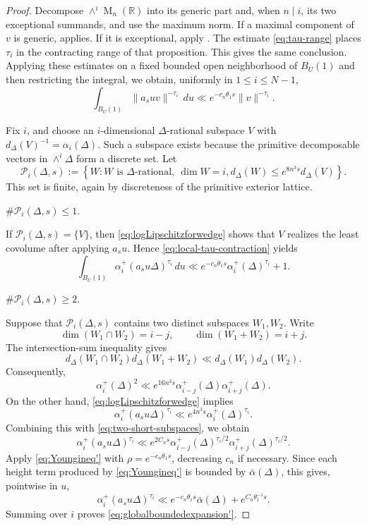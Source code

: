 \documentclass[reqno,11pt]{amsart}
\numberwithin{equation}{section}
\theoremstyle{definition}
\theoremstyle{remark}
\newcommand{\op}{\operatorname}
\newcommand{\M}{\op{M}}
\begin{document}
\begin{proof}
 Decompose
$\wedge^i\M_n(\mathbb R)$ into its generic part and, when $n\mid i$,
its two exceptional summands, and use the maximum norm. If a maximal component
of $v$ is generic, 
applies. If it is exceptional, apply
. The estimate
\eqref{eq:tau-range} places $\tau_i$ in the contracting range of that
proposition. This gives the same conclusion. Applying these estimates on a
fixed bounded open neighborhood of $B_{U}(1)$ and then restricting the
integral, we obtain, uniformly in $1\le i\le N-1$,
\begin{equation}\label{eq:local-tau-contraction}
\int_{B_{U}(1)}\|a_suv\|^{-\tau_i}\,du
\ll e^{-c_n\theta_1 s}\|v\|^{-\tau_i}.
\end{equation}

Fix $i$, and choose an $i$-dimensional $\Delta$-rational subspace
$V$ with
$d_\Delta(V)^{-1}=\alpha_i(\Delta)$. Such a subspace exists because
the primitive decomposable vectors in $\wedge^i\Delta$ form a discrete
set. Let
$$
\mathcal P_i(\Delta,s)
:=
\left\{
W:
W\text{ is $\Delta$-rational},\ \dim W=i,
d_\Delta(W)\le e^{8n^3s}d_\Delta(V)
\right\}.
$$
This set is finite, again by discreteness of the primitive exterior lattice.

 $\#\mathcal P_i(\Delta,s)\leq 1 $.

If $\mathcal P_i(\Delta,s)=\{V\}$, then
\eqref{eq:logLipschitzforwedge} shows that $V$ realizes the least
covolume after applying $a_su$. Hence
\eqref{eq:local-tau-contraction} yields
$$
\int_{B_{U}(1)}
\alpha_i^+(a_su\Delta)^{\tau_i}\,du
\ll
 e^{-c_n\theta_1 s}
\alpha_i^+(\Delta)^{\tau_i}+1.
$$

 $\#\mathcal P_i(\Delta,s)\geq 2 $.

Suppose that $\mathcal P_i(\Delta,s)$ contains two distinct
subspaces $W_1,W_2$. Write
$$
\dim(W_1\cap W_2)=i-j,
\qquad
\dim(W_1+W_2)=i+j.
$$
The intersection-sum inequality
\cite[Lemma~5.6]{eskin-margulis-mozes:1998} gives
\begin{equation}\label{eq:EMMintersectionsum}
    d_\Delta(W_1\cap W_2)d_\Delta(W_1+W_2)
\ll d_\Delta(W_1)d_\Delta(W_2).
\end{equation}
Consequently,
\begin{equation}\label{eq:two-short-subspaces}
\alpha_i^+(\Delta)^2
\ll
e^{16n^3s}
\alpha_{i-j}^+(\Delta)\alpha_{i+j}^+(\Delta).
\end{equation}
On the other hand, \eqref{eq:logLipschitzforwedge} implies
$$
\alpha_i^+(a_su\Delta)^{\tau_i}
\ll e^{4n^3s}
\alpha_i^+(\Delta)^{\tau_i}.
$$
Combining this with \eqref{eq:two-short-subspaces}, we obtain
$$
\alpha_i^+(a_su\Delta)^{\tau_i}
\ll
e^{2C_ns}
\alpha_{i-j}^+(\Delta)^{\tau_i/2}
\alpha_{i+j}^+(\Delta)^{\tau_i/2}.
$$
Apply \eqref{eq:Youngineq'} with
$\rho=e^{-c_n\theta_1 s}$, decreasing $c_n$ if necessary.
Since each height term produced by \eqref{eq:Youngineq'} is bounded by
$\bar\alpha(\Delta)$, this gives, pointwise in $u$,
$$
\alpha_i^+(a_su\Delta)^{\tau_i}
\ll
 e^{-c_n\theta_1 s}\bar\alpha(\Delta)
+e^{C_n\theta_1^{-1}s}.
$$
Summing over $i$ proves \eqref{eq:globalboundedexpansion'}.
\end{proof}
\end{document}

